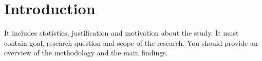 \section{Introduction}
    It includes statistics, justification and motivation about the study. It must contain goal, research question and scope of the research. You should provide an overview of the methodology and the main findings.